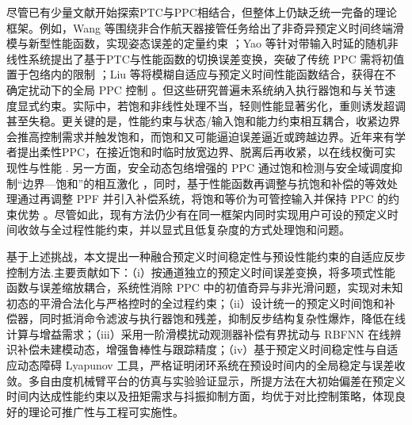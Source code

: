 \documentclass[pdflatex,sn-mathphys-num]{sn-jnl}%
\theoremstyle{thmstyleone}%
\theoremstyle{thmstyletwo}%
\theoremstyle{thmstylethree}%
\begin{document}
尽管已有少量文献开始探索PTC与PPC相结合，但整体上仍缺乏统一完备的理论框架。例如，Wang 等围绕非合作航天器接管任务给出了非奇异预定义时间终端滑模与新型性能函数，实现姿态误差的定量约束 \cite{WangEtAl_2023_Predefinedtimeguaranteed}；Yao 等针对带输入时延的随机非线性系统提出了基于PTC与性能函数的切换误差变换，突破了传统 PPC 需将初值置于包络内的限制 \cite{YaoEtAl_2024_Prescribedtimeprescribed}；Liu 等将模糊自适应与预定义时间性能函数结合，获得在不确定扰动下的全局 PPC 控制 \cite{LiuEtAl_2025_Fuzzyadaptive}。但这些研究普遍未系统纳入执行器饱和与关节速度显式约束。实际中，若饱和非线性处理不当，轻则性能显著劣化，重则诱发超调甚至失稳。更关键的是，性能约束与状态/输入饱和能力约束相互耦合，收紧边界会推高控制需求并触发饱和，而饱和又可能逼迫误差逼近或跨越边界。近年来有学者提出柔性PPC，在接近饱和时临时放宽边界、脱离后再收紧，以在线权衡可实现性与性能 \cite{Bu_2023_Hypersonic,Yao_2024_Flexible}. 另一方面，安全动态包络增强的 PPC 通过饱和检测与安全域调度抑制“边界—饱和”的相互激化 \cite{Wang_2025_Enhanced}，同时，基于性能函数再调整与抗饱和补偿的等效处理通过再调整 PPF 并引入补偿系统，将饱和等价为可管控输入并保持 PPC 的约束优势 \cite{ElikerJouffroy_2025_robustquadrotor}。尽管如此，现有方法仍少有在同一框架内同时实现用户可设的预定义时间收敛与全过程性能约束，并以显式且低复杂度的方式处理饱和问题。

基于上述挑战，本文提出一种融合预定义时间稳定性与预设性能约束的自适应反步控制方法.主要贡献如下：（i）按通道独立的预定义时间误差变换，将多项式性能函数与误差缩放耦合，系统性消除 PPC 中的初值奇异与非光滑问题，实现对未知初态的平滑合法化与严格控时的全过程约束；（ii）设计统一的预定义时间饱和补偿器，同时抵消命令滤波与执行器饱和残差，抑制反步结构复杂性爆炸，降低在线计算与增益需求；（iii）采用一阶滑模扰动观测器补偿有界扰动与 RBFNN 在线辨识补偿未建模动态，增强鲁棒性与跟踪精度；（iv）基于预定义时间稳定性与自适应动态障碍 Lyapunov 工具，严格证明闭环系统在预设时间内的全局稳定与误差收敛。多自由度机械臂平台的仿真与实验验证显示，所提方法在大初始偏差在预定义时间内达成性能约束以及扭矩需求与抖振抑制方面，均优于对比控制策略，体现良好的理论可推广性与工程可实施性。

\end{document}
